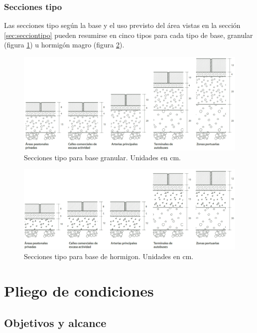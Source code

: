 \documentclass[12pt,titlepage,openright]{report}
\begin{document}
\section{Secciones tipo}

Las secciones tipo según la base y el uso previsto del área vistas en la sección \ref{sec:secciontipo} pueden resumirse en cinco tipos para cada tipo de base, granular (figura \ref{fig:seccionestipogranular}) u hormigón magro (figura \ref{fig:seccionestipohormigon}).

\begin{figure}[!htb]
\centering
\includegraphics[width=15cm]{seccionestipo_1.png}
\caption{Secciones tipo para base granular. Unidades en cm.}
\label{fig:seccionestipogranular}
\end{figure}

\begin{figure}[!htb]
\centering
\includegraphics[width=15cm]{seccionestipo_2.png}
\caption{Secciones tipo para base de hormigon. Unidades en cm.}
\label{fig:seccionestipohormigon}
\end{figure}


\cleardoublepage
\part*{Pliego de condiciones}

\chapter{Objetivos y alcance}
\end{document}
